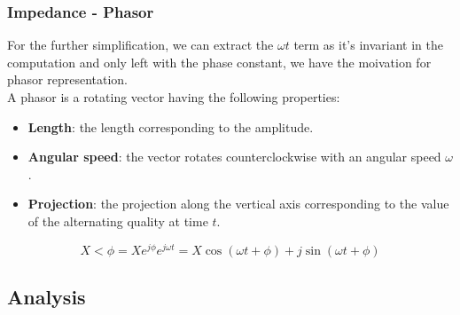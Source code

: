 \documentclass[UTF8]{article}
\newenvironment{theorem}[2][Theorem]{\begin{trivlist}
\item[\hskip \labelsep {\bfseries #1}\hskip \labelsep {\bfseries }]}{\end{trivlist}}
\begin{document}
\subsubsection{Impedance - Phasor} 
For the further simplification, we can extract the $\omega t$ term as it's invariant in the computation and only left with the phase constant, we have the moivation for phasor representation. \\ 
A phasor is a rotating vector having the following properties:
\begin{itemize}
\item  {\textbf{Length}}: the length corresponding to the amplitude.
\item  {\textbf{Angular speed}}: the vector rotates counterclockwise with an angular speed $\omega $.
\item  {\textbf{Projection}}: the projection along the vertical axis corresponding to the value of the alternating quality at time $t$.
\end{itemize}
$$X<\phi = Xe^{j\phi}e^{j\omega t} = X\cos (\omega t+\phi)+j\sin (\omega t+\phi)$$
\pagebreak
\subsection{Analysis}
\end{document}
